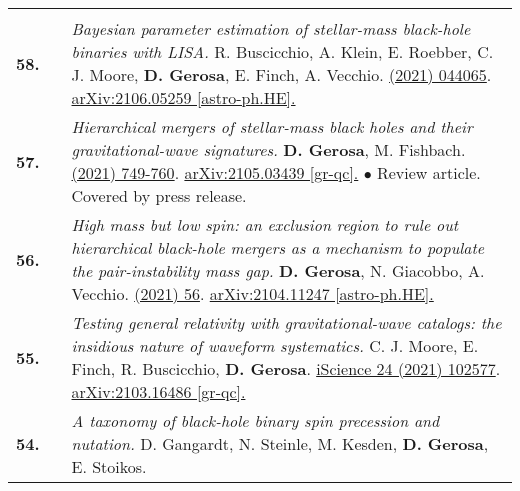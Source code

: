 {\begin{longtable}{rp{0.3cm}p{15.8cm}}
\vspace{0.09cm}\\
%
\textbf{58.} & & \textit{Bayesian parameter estimation of stellar-mass black-hole binaries with LISA.}
\newline{}
R. Buscicchio, A. Klein, E. Roebber, C. J. Moore, \textbf{D. Gerosa}, E. Finch, A. Vecchio.
\newline{}
\href{https://journals.aps.org/prd/abstract/10.1103/PhysRevD.104.044065}{\prd 104 (2021) 044065}. \href{https://arxiv.org/abs/2106.05259}{arXiv:2106.05259 [astro-ph.HE].}
\vspace{0.09cm}\\
%
\textbf{57.} & & \textit{Hierarchical mergers of stellar-mass black holes and their gravitational-wave signatures.}
\newline{}
\textbf{D. Gerosa}, M. Fishbach.
\newline{}
\href{https://www.nature.com/articles/s41550-021-01398-w}{\natastro 5 (2021) 749-760}. \href{https://arxiv.org/abs/2105.03439}{arXiv:2105.03439 [gr-qc].}
\newline{}
\textcolor{color1}{$\bullet$} Review article. Covered by press release.
\vspace{0.09cm}\\
%
\textbf{56.} & & \textit{High mass but low spin: an exclusion region to rule out hierarchical black-hole mergers as a mechanism to populate the pair-instability mass gap.}
\newline{}
\textbf{D. Gerosa}, N. Giacobbo, A. Vecchio.
\newline{}
\href{https://iopscience.iop.org/article/10.3847/1538-4357/ac00bb}{\apj 915 (2021) 56}. \href{https://arxiv.org/abs/2104.11247}{arXiv:2104.11247   [astro-ph.HE].}
\vspace{0.09cm}\\
%
\textbf{55.} & & \textit{Testing general relativity with gravitational-wave catalogs: the insidious nature of waveform systematics.}
\newline{}
C. J. Moore, E. Finch, R. Buscicchio, \textbf{D. Gerosa}.
\newline{}
\href{https://www.sciencedirect.com/science/article/pii/S2589004221005459}{iScience 24 (2021) 102577}. \href{https://arxiv.org/abs/2103.16486}{arXiv:2103.16486   [gr-qc].}
\vspace{0.09cm}\\
%
\textbf{54.} & & \textit{A taxonomy of black-hole binary spin precession and nutation.}
\newline{}
D. Gangardt, N. Steinle, M. Kesden, \textbf{D. Gerosa}, E. Stoikos.

\end{longtable}}
